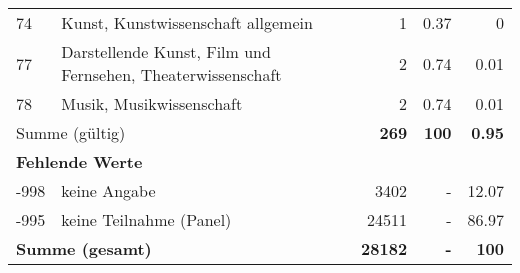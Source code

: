 \begin{longtable}{lXrrr}
        74 & \multicolumn{1}{X}{Kunst, Kunstwissenschaft allgemein} & %
          \num{1} &
          \num[round-mode=places,round-precision=2]{0.37} &
          \num[round-mode=places,round-precision=2]{0} \\

        77 & \multicolumn{1}{X}{Darstellende Kunst, Film und Fernsehen, Theaterwissenschaft} & %
          \num{2} &
          \num[round-mode=places,round-precision=2]{0.74} &
          \num[round-mode=places,round-precision=2]{0.01} \\

        78 & \multicolumn{1}{X}{Musik, Musikwissenschaft} & %
          \num{2} &
          \num[round-mode=places,round-precision=2]{0.74} &
          \num[round-mode=places,round-precision=2]{0.01} \\

     \midrule
     \multicolumn{2}{l}{Summe (gültig)} &
       \textbf{\num{269}} &
     \textbf{\num{100}} &
       \textbf{\num[round-mode=places,round-precision=2]{0.95}} \\
     \multicolumn{5}{l}{\textbf{Fehlende Werte}}\\
       -998 &
       keine Angabe &
         \num{3402} &
        - &
         \num[round-mode=places,round-precision=2]{12.07} \\
       -995 &
       keine Teilnahme (Panel) &
         \num{24511} &
        - &
         \num[round-mode=places,round-precision=2]{86.97} \\
     \midrule
     \multicolumn{2}{l}{\textbf{Summe (gesamt)}} &
          \textbf{\num{28182}} &
        \textbf{-} &
        \textbf{\num{100}} \\
     \bottomrule
     \end{longtable}
     
